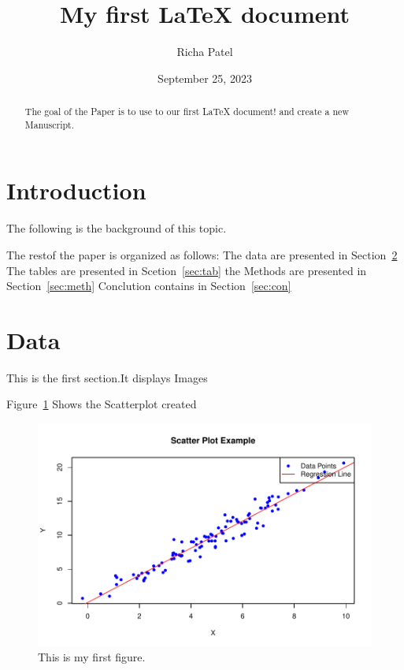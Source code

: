 \documentclass[12pt, letterpaper]{article}
\title{My first LaTeX document}
\author{Richa Patel}
\date{September 25, 2023}
\begin{document}
\maketitle 

\begin{abstract}
The goal of the Paper is to use to our first \LaTeX{} document! and create a new Manuscript.
\end{abstract}

\section{Introduction}
\label{sec:intro}

The following is the background of this topic.

The restof the paper is organized as follows:
The data are presented in Section~\ref{sec:data}
The tables are presented in Scetion~\ref{sec:tab}
the Methods are presented in Section~\ref{sec:meth}
Conclution contains in Section~\ref{sec:con}

\section{Data}
\label{sec:data}

This is the first section.It displays Images

Figure~\ref{fig:Image1} Shows the Scatterplot created

\begin{figure}[tbp]
  \centering
  \includegraphics[width=\textwidth]{Image1.pdf}
  \caption{This is my first figure.}
  \label{fig:Image1}
\end{figure}
\end{document}
